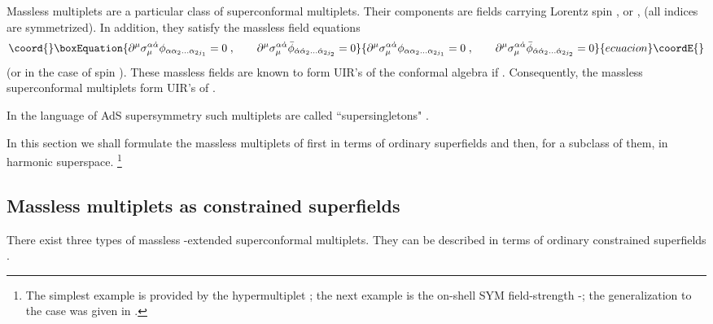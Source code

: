 \documentclass[a4paper,12pt]{article}
\begin{document}
Massless multiplets are a particular class of superconformal 
multiplets. Their components are fields carrying Lorentz spin 
\coordHE{}, \coordHE{} or \coordHE{},  
\coordHE{} (all indices 
are symmetrized). In addition, they satisfy the massless field 
equations 
\begin{equation}\coord{}\boxEquation{\label{4.0}
\partial^\mu 
\sigma_\mu^{\alpha\dot\alpha}\phi_{\alpha\alpha_2\ldots\alpha_{2j_1}} 
= 0\;, \qquad \partial^\mu 
\sigma_\mu^{\alpha\dot\alpha}
\bar\phi_{\dot\alpha\dot\alpha_2\ldots\dot\alpha_{2j_2}} 
=0 
}{\partial^\mu 
\sigma_\mu^{\alpha\dot\alpha}\phi_{\alpha\alpha_2\ldots\alpha_{2j_1}} 
= 0\;, \qquad \partial^\mu 
\sigma_\mu^{\alpha\dot\alpha}
\bar\phi_{\dot\alpha\dot\alpha_2\ldots\dot\alpha_{2j_2}} 
=0 
}{ecuacion}\coordE{}\end{equation}
(or \coordHE{} in the case of spin \coordHE{}). These 
massless fields are known \cite{BFH} to form UIR's of the 
conformal algebra \coordHE{} if \coordHE{}. Consequently, 
the massless superconformal multiplets form UIR's of 
\coordHE{} \cite{dp,bin}. 

In the language of AdS supersymmetry such multiplets are called 
``supersingletons" \cite{NS,GW}. 

In this section we shall formulate the massless multiplets of 
\coordHE{} first in terms of ordinary superfields and 
then, for a subclass of them, in \coordHE{} harmonic superspace. 
\footnote{The simplest example is provided by the \coordHE{} 
hypermultiplet \cite{GIK1}; the next example is the \coordHE{} 
on-shell SYM field-strength \cite{GIK2}-\cite{Bandos}; the 
generalization to the case \coordHE{} was given in \cite{hh}.} 


\subsection{Massless multiplets as constrained superfields}

There exist three types of massless \coordHE{}-extended superconformal 
multiplets. They can be described in terms of ordinary constrained 
superfields \cite{Siegel,HST}.  
\end{document}
